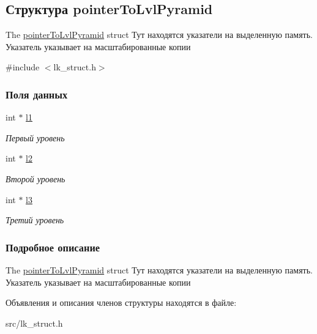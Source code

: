 \hypertarget{structpointerToLvlPyramid}{}\subsection{Структура pointer\+To\+Lvl\+Pyramid}
\label{structpointerToLvlPyramid}


The \hyperlink{structpointerToLvlPyramid}{pointer\+To\+Lvl\+Pyramid} struct Тут находятся указатели на выделенную память. Указатель указывает на масштабированные копии  




{\ttfamily \#include $<$lk\+\_\+struct.\+h$>$}

\subsubsection*{Поля данных}
\begin{DoxyCompactItemize}
\item 
\hypertarget{structpointerToLvlPyramid_af25852f78e4e7599186e754a84a9bc28}{}int $\ast$ \hyperlink{structpointerToLvlPyramid_af25852f78e4e7599186e754a84a9bc28}{l1}\label{structpointerToLvlPyramid_af25852f78e4e7599186e754a84a9bc28}

\begin{DoxyCompactList}\small\item\em Первый уровень \end{DoxyCompactList}\item 
\hypertarget{structpointerToLvlPyramid_a2be50ce983dddf0025ff4b85ec7962fe}{}int $\ast$ \hyperlink{structpointerToLvlPyramid_a2be50ce983dddf0025ff4b85ec7962fe}{l2}\label{structpointerToLvlPyramid_a2be50ce983dddf0025ff4b85ec7962fe}

\begin{DoxyCompactList}\small\item\em Второй уровень \end{DoxyCompactList}\item 
\hypertarget{structpointerToLvlPyramid_aa95ae281e6be3a8aaa84f7346e098091}{}int $\ast$ \hyperlink{structpointerToLvlPyramid_aa95ae281e6be3a8aaa84f7346e098091}{l3}\label{structpointerToLvlPyramid_aa95ae281e6be3a8aaa84f7346e098091}

\begin{DoxyCompactList}\small\item\em Третий уровень \end{DoxyCompactList}\end{DoxyCompactItemize}


\subsubsection{Подробное описание}
The \hyperlink{structpointerToLvlPyramid}{pointer\+To\+Lvl\+Pyramid} struct Тут находятся указатели на выделенную память. Указатель указывает на масштабированные копии 

Объявления и описания членов структуры находятся в файле\+:\begin{DoxyCompactItemize}
\item 
src/lk\+\_\+struct.\+h\end{DoxyCompactItemize}
